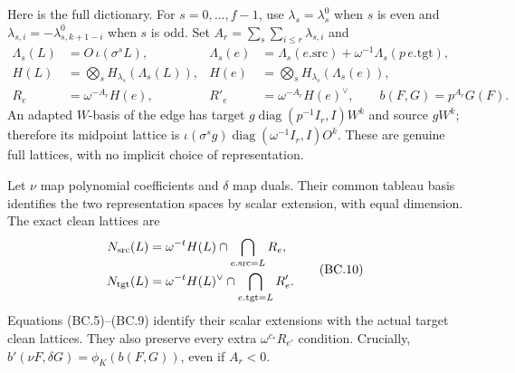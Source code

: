 Here is the full dictionary. For $s=0,\ldots,f-1$, use
$\lambda_s=\lambda_s^0$ when $s$ is even and
$\lambda_{s,i}=-\lambda^0_{s,k+1-i}$ when $s$ is odd. Set
$A_r=\sum_s\sum_{i\le r}\lambda_{s,i}$ and
\[
\begin{aligned}
 \Lambda_s(L)&=O\,\iota(\sigma^sL),&
 \Lambda_s(e)&=\Lambda_s(e.\mathrm{src})
                   +\omega^{-1}\Lambda_s(p\,e.\mathrm{tgt}),\\
 H(L)&=\bigotimes_s H_{\lambda_s}(\Lambda_s(L)),&
 H(e)&=\bigotimes_s H_{\lambda_s}(\Lambda_s(e)),\\
 R_e&=\omega^{-A_r}H(e),&R'_e&=\omega^{-A_r}H(e)^\vee,
 \qquad b(F,G)=p^{A_r}G(F).
\end{aligned}                                             \tag{BC.9}
\]
An adapted $W$-basis of the edge has target
$g\operatorname{diag}(p^{-1}I_r,I)W^k$ and source $gW^k$;
therefore its midpoint lattice is
$\iota(\sigma^sg)\operatorname{diag}(\omega^{-1}I_r,I)O^k$.
These are genuine full lattices, with no implicit choice of representation.

Let $\nu$ map polynomial coefficients and $\delta$ map duals. Their
common tableau basis identifies the two representation spaces by scalar
extension, with equal dimension. The exact clean lattices are
\[
\begin{aligned}
 N_{\rm src}(L)&=\omega^{-t}H(L)\cap
                           \bigcap_{e.\mathrm{src}=L}R_e,\\
 N_{\rm tgt}(L)&=\omega^{-t}H(L)^\vee\cap
                           \bigcap_{e.\mathrm{tgt}=L}R'_e.
\end{aligned}                                             \tag{BC.10}
\]
Equations (BC.5)--(BC.9) identify their scalar extensions with the
actual target clean lattices. They also preserve every extra
$\omega^{c_*}R_{e'}$ condition. Crucially,
$b'(\nu F,\delta G)=\phi_K(b(F,G))$, even if $A_r<0$.

